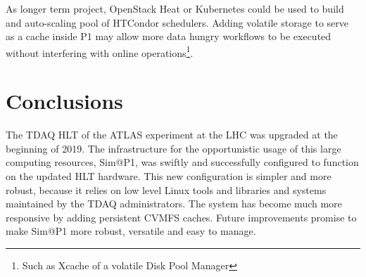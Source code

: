 \documentclass{webofc}
\begin{document}
As longer term project, OpenStack Heat or Kubernetes could be used to build
and auto-scaling pool of HTCondor schedulers. Adding volatile storage to
serve as a cache inside P1 may allow more data hungry workflows to be executed
without interfering with online operations\footnote{Such as Xcache of a volatile
Disk Pool Manager}.

\section{Conclusions}
The TDAQ HLT of the ATLAS experiment at the LHC was upgraded at the beginning of
2019. The infrastructure for the opportunistic usage of this large computing
resources, Sim@P1, was swiftly and successfully configured to function on the
updated HLT hardware. This new configuration is simpler and more robust, because
it relies on low level Linux tools and libraries and systems maintained by the
TDAQ administrators. The system has become much more responsive by adding
persistent CVMFS caches. Future improvements promise to make Sim@P1 more robust,
versatile and easy to manage.
\end{document}

